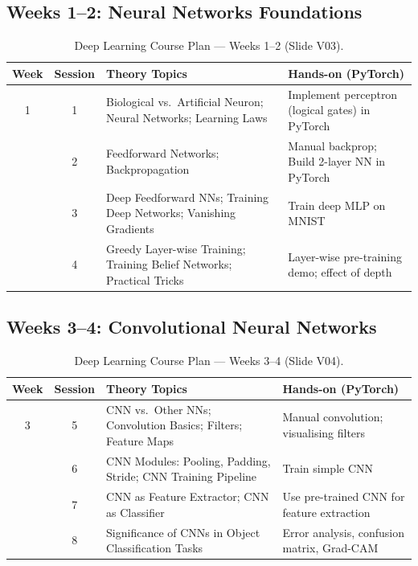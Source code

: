 \documentclass[12pt,a4paper]{article}
\begin{document}
\subsection{Weeks 1--2: Neural Networks Foundations}
\label{subsec:weeks12}

\begin{table}[ht]
\centering
\caption{Deep Learning Course Plan — Weeks 1--2 (Slide V03).}
\label{tab:weeks12}
\begin{tabularx}{\textwidth}{cclX}
\toprule
\textbf{Week} & \textbf{Session} & \textbf{Theory Topics} & \textbf{Hands-on (PyTorch)} \\
\midrule
1 & 1 & Biological vs.\ Artificial Neuron; Neural Networks; Learning Laws
      & Implement perceptron (logical gates) in PyTorch \\
\addlinespace
1 & 2 & Feedforward Networks; Backpropagation
      & Manual backprop; Build 2-layer NN in PyTorch \\
\addlinespace
2 & 3 & Deep Feedforward NNs; Training Deep Networks; Vanishing Gradients
      & Train deep MLP on MNIST \\
\addlinespace
2 & 4 & Greedy Layer-wise Training; Training Belief Networks; Practical Tricks
      & Layer-wise pre-training demo; effect of depth \\
\bottomrule
\end{tabularx}
\end{table}

\subsection{Weeks 3--4: Convolutional Neural Networks}
\label{subsec:weeks34}

\begin{table}[ht]
\centering
\caption{Deep Learning Course Plan — Weeks 3--4 (Slide V04).}
\label{tab:weeks34}
\begin{tabularx}{\textwidth}{cclX}
\toprule
\textbf{Week} & \textbf{Session} & \textbf{Theory Topics} & \textbf{Hands-on (PyTorch)} \\
\midrule
3 & 5 & CNN vs.\ Other NNs; Convolution Basics; Filters; Feature Maps
      & Manual convolution; visualising filters \\
\addlinespace
3 & 6 & CNN Modules: Pooling, Padding, Stride; CNN Training Pipeline
      & Train simple CNN \\
\addlinespace
4 & 7 & CNN as Feature Extractor; CNN as Classifier
      & Use pre-trained CNN for feature extraction \\
\addlinespace
4 & 8 & Significance of CNNs in Object Classification Tasks
      & Error analysis, confusion matrix, Grad-CAM \\
\bottomrule
\end{tabularx}
\end{table}
\end{document}
